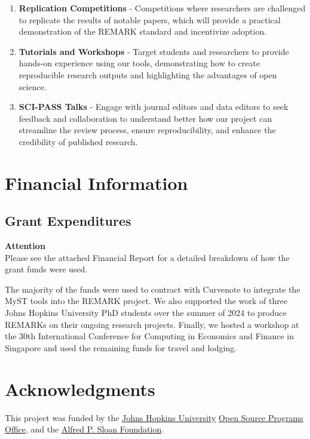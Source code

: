 \documentclass{article}
\begin{document}
\begin{enumerate}
\item \textbf{Replication Competitions} - Competitions where researchers are challenged to replicate the results of notable papers, which will provide a practical demonstration of the REMARK standard and incentivize adoption.
\item \textbf{Tutorials and Workshops} - Target students and researchers to provide hands-on experience using our tools, demonstrating how to create reproducible research outputs and highlighting the advantages of open science.
\item \textbf{SCI-PASS Talks} - Engage with journal editors and data editors to seek feedback and collaboration to understand better how our project can streamline the review process, ensure reproducibility, and enhance the credibility of published research.
\end{enumerate}





\section{Financial Information}

\subsection{Grant Expenditures}


\begin{framed}
\textbf{Attention}\\
Please see the attached Financial Report for a detailed breakdown of how the grant funds were used.
\end{framed}

The majority of the funds were used to contract with Curvenote to integrate the MyST tools into the REMARK project. We also supported the work of three Johns Hopkins University PhD students over the summer of 2024 to produce REMARKs on their ongoing research projects. Finally, we hosted a workshop at the 30th International Conference for Computing in Economics and Finance in Singapore and used the remaining funds for travel and lodging.



\section*{Acknowledgments}
This project was funded by the \href{https://jhu.edu}{Johns Hopkins University} \href{https://ospo.library.jhu.edu/}{Open Source Programs Office}, and the \href{https://sloan.org}{Alfred P. Sloan Foundation}.
\end{document}
